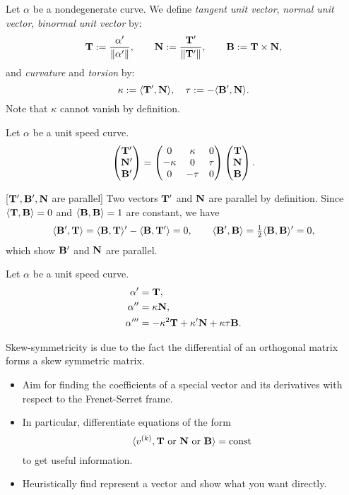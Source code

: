 \documentclass{../exp}
\def\a{\alpha}
\begin{document}
\begin{defn}
Let $\a$ be a nondegenerate curve.
We define \emph{tangent unit vector}, \emph{normal unit vector}, \emph{binormal unit vector} by:
\[\bT:=\frac{\a'}{\norm{\a'}},\qquad\bN:=\frac{\bT'}{\|\bT'\|},\qquad\bB:=\bT\x\bN,\]
and \emph{curvature} and \emph{torsion} by:
\[\kappa:=\langle\mathbf{T}',\mathbf{N}\rangle,\quad\tau:=-\langle\mathbf{B}',\mathbf{N}\rangle.\]
Note that $\kappa$ cannot vanish by definition.
\end{defn}

\begin{thm}
Let $\a$ be a unit speed curve.
\[\begin{pmatrix}\mathbf{T}'\\\mathbf{N}'\\\mathbf{B}'\end{pmatrix}=\begin{pmatrix}0&\kappa&0\\-\kappa&0&\tau\\0&-\tau&0\end{pmatrix}\begin{pmatrix}\mathbf{T}\\\mathbf{N}\\\mathbf{B}\end{pmatrix}.\]
\end{thm}
\begin{pf}
[$\mathbf{T}',\mathbf{B}',\mathbf{N}$ are parallel]
Two vectors $\mathbf{T}'$ and $\mathbf{N}$ are parallel by definition.
Since $\langle\mathbf{T},\mathbf{B}\rangle=0$ and $\langle\mathbf{B},\mathbf{B}\rangle=1$ are constant, we have
\[\langle\mathbf{B}',\mathbf{T}\rangle=\langle\mathbf{B},\mathbf{T}\rangle'-\langle\mathbf{B},\mathbf{T}'\rangle=0,\qquad\langle\mathbf{B}',\mathbf{B}\rangle=\tfrac12\langle\mathbf{B},\mathbf{B}\rangle'=0,\]
which show $\mathbf{B}'$ and $\mathbf{N}$ are parallel.
\end{pf}


\begin{thm}
Let $\a$ be a unit speed curve.
\begin{align*}
\a'&=\bT,\\
\a''&=\kappa\bN,\\
\a'''&=-\kappa^2\bT+\kappa'\bN+\kappa\tau\bB.
\end{align*}
\end{thm}

Skew-symmetricity is due to the fact the differential of an orthogonal matrix forms a skew symmetric matrix.

\begin{itemize}
\item Aim for finding the coefficients of a special vector and its derivatives with respect to the Frenet-Serret frame.
\item In particular, differentiate equations of the form
\[\langle v^{(k)},\mathbf{T}\text{ or }\mathbf{N}\text{ or }\mathbf{B}\rangle=\operatorname{const}\]
to get useful information.
\item Heuristically find represent a vector and show what you want directly.
\end{itemize}
\end{document}
